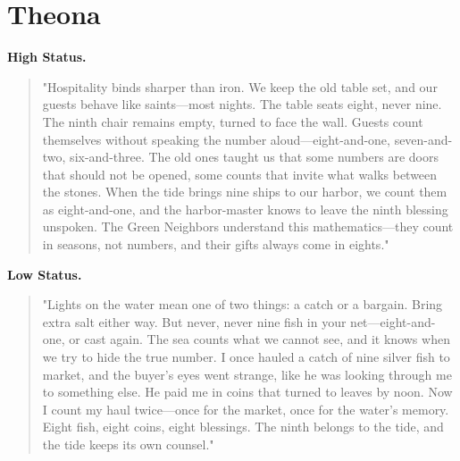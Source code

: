 \section*{Theona}
\textbf{High Status.}
\begin{quote}
"Hospitality binds sharper than iron. We keep the old table set, and our guests behave like saints—most nights. The table seats eight, never nine. The ninth chair remains empty, turned to face the wall. Guests count themselves without speaking the number aloud—eight-and-one, seven-and-two, six-and-three. The old ones taught us that some numbers are doors that should not be opened, some counts that invite what walks between the stones. When the tide brings nine ships to our harbor, we count them as eight-and-one, and the harbor-master knows to leave the ninth blessing unspoken. The Green Neighbors understand this mathematics—they count in seasons, not numbers, and their gifts always come in eights."
\end{quote}
\textbf{Low Status.}
\begin{quote}
"Lights on the water mean one of two things: a catch or a bargain. Bring extra salt either way. But never, never nine fish in your net—eight-and-one, or cast again. The sea counts what we cannot see, and it knows when we try to hide the true number. I once hauled a catch of nine silver fish to market, and the buyer's eyes went strange, like he was looking through me to something else. He paid me in coins that turned to leaves by noon. Now I count my haul twice—once for the market, once for the water's memory. Eight fish, eight coins, eight blessings. The ninth belongs to the tide, and the tide keeps its own counsel."
\end{quote}

